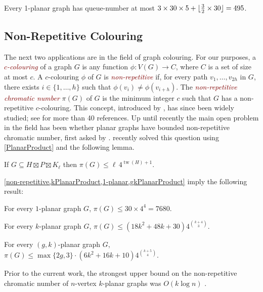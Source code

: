 \documentclass{patmorin}
\newcommand{\defin}[1]{\textcolor{Maroon}{\emph{#1}}}
\DeclareMathOperator{\tw}{tw}
\DeclarePairedDelimiter{\floor}{\lfloor}{\rfloor}
\renewcommand{\le}{\leqslant}
\begin{document}
\begin{cor}
\label{1PlanarQueue}
Every 1-planar graph has queue-number at most $3 \times 30 \times 5 + \floor{\tfrac{3}{2} \times 30} = 495$. 
\end{cor}


\subsection{Non-Repetitive Colouring}

The next two applications are in the field of graph colouring. For our purposes, a \defin{$c$-colouring} of a graph $G$ is any function $\phi\colon V(G)\to C$, where $C$ is a set of size at most $c$.
A $c$-colouring $\phi$ of $G$ is \defin{non-repetitive} if, for every path $v_1,\ldots,v_{2h}$ in $G$, there exists $i\in\{1,\ldots,h\}$ such that $\phi(v_i)\neq\phi(v_{i+h})$.  The \defin{non-repetitive chromatic number} $\pi(G)$ of $G$ is the minimum integer $c$ such that $G$ has a non-repetitive $c$-colouring. This concept, introduced by \citet{AGHR-RSA02}, has since been widely studied; see \citep{dujmovic.esperet.ea:planar} for more than 40 references. Up until recently the main open problem in the field has been whether planar graphs have bounded non-repetitive chromatic number, first asked by \citet{AGHR-RSA02}. \citet{dujmovic.esperet.ea:planar} recently solved this question using \cref{PlanarProduct} and the following lemma.

\begin{lem}
\label{non-repetitive}
If $G\subseteq H\boxtimes P \boxtimes K_\ell$ then $\pi(G)\le \ell\, 4^{\tw(H)+1}$.
\end{lem}

\cref{non-repetitive,kPlanarProduct,1-planar,gkPlanarProduct} imply the following result:

\begin{cor}\quad
\begin{compactitem}
\item	For every $1$-planar graph $G$, $\pi(G)\le 30\times 4^4=7680$.
\item For every $k$-planar graph $G$,
	$\pi(G)\le (18k^2+48k+30) 4^{\binom{k+4}{3}}$.
\item	For every $(g,k)$-planar graph $G$,
	$  \pi(G)\le \max\{2g,3\}\cdot(6k^2+16k+10) 4^{\binom{k+5}{4}}.$
\end{compactitem}
\end{cor}

Prior to the current work, the strongest upper bound on the non-repetitive chromatic number of $n$-vertex  $k$-planar graphs was $O(k\log n)$ \cite{dujmovic.morin.ea:layered}.
\end{document}
